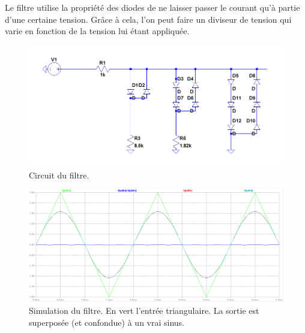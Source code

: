 
Le filtre utilise la propriété des diodes de ne laisser passer 
le courant qu'à partie d'une certaine tension. Grâce à cela,
l'on peut faire un diviseur de tension qui varie en fonction 
de la tension lui étant appliquée. 

\begin{figure}[ht]
	\centering
	\includegraphics[scale=0.4]{img-filter/filter-circuit.jpg}
	\caption{Circuit du filtre.}
	\label{fig:filter-spice-graph}
\end{figure}

\begin{figure}[ht]
	\centering
	\includegraphics[scale=0.3]{img-filter/filter-spice-graph.jpg}
	\caption{Simulation du filtre. En vert l'entrée triangulaire. La
	sortie est superposée (et confondue) à un vrai sinus.}
	\label{fig:filter-spice-graph}
\end{figure}

